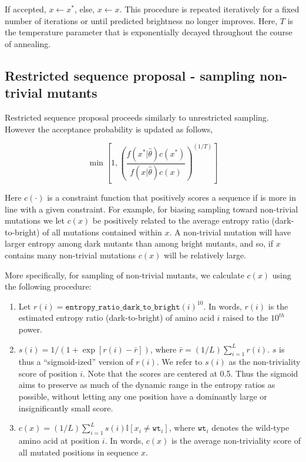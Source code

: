 If accepted, $x \leftarrow x^*$, else, $x \leftarrow x$. This procedure is repeated iteratively for a fixed number of iterations or until predicted brightness no longer improves. Here, $T$ is the temperature parameter that is exponentially decayed throughout the course of annealing. 

\subsection{Restricted sequence proposal - sampling non-trivial mutants}

Restricted sequence proposal proceeds similarly to unrestricted sampling. However the acceptance probability is updated as follows, 

\[
\min\left[1, \left( \frac{f(x^*|\hat{\theta})c(x^*) }{f(x|\hat{\theta})c(x)}\right)^{(1/T)}   \right]
\]

Here $c(\cdot)$ is a constraint function that positively scores a sequence if is more in line with a given constraint. For example, for biasing sampling toward non-trivial mutations we let $c(x)$ be positively related to the average entropy ratio (dark-to-bright) of all mutations contained within $x$. A non-trivial mutation will have larger entropy among dark mutants than among bright mutants, and so, if $x$ contains many non-trivial mutations $c(x)$ will be relatively large. 

More specifically, for sampling of non-trivial mutants, we calculate $c(x)$ using the following procedure:

\begin{enumerate}
\item Let $r(i) = \mathtt{entropy\_ratio\_dark\_to\_bright}(i)^{10}$. In words, $r(i)$ is the estimated entropy ratio (dark-to-bright) of amino acid $i$ raised to the $10^{th}$ power.
\item $s(i) = 1/(1 + \exp[ r(i) - \bar{r} ])$, where $\bar{r} = (1/L) \sum_{i=1}^{L} r(i)$. $s$ is thus a ``sigmoid-ized'' version of $r(i)$. We refer to $s(i)$ as the non-triviality score of position $i$. Note that the scores are centered at 0.5. Thus the sigmoid aims to preserve as much of the dynamic range in the entropy ratios as possible, without letting any one position have a dominantly large or insignificantly small score. 
\item $c(x) = (1/L)\sum_{i=1}^L s(i) \mathbb{I}[x_i \neq \mathtt{wt}_i] $, where $\mathtt{wt}_i$ denotes the wild-type amino acid at position $i$. In words, $c(x)$ is the average non-triviality score of all mutated positions in sequence $x$. 
\end{enumerate}



